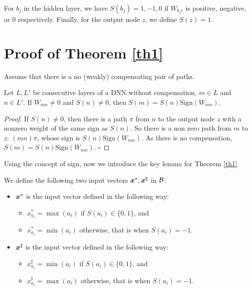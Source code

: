 For $b_j$ in the hidden layer, we have $S(b_j)=1,-1,0$ if $W_{b_j c}$ is positive, negative, or 0 respectively. Finally, for the output node $z$, we define $S(z)=1$.





\section{Proof of Theorem \ref{th1}}	


Assume that there is a no (weakly) compensating pair of paths.


\begin{lemma}
	\label{lemma1}
	Let $L,L'$ be consecutive layers of a DNN without compensation, 
	$m\in L$ and $n\in L'$. If $W_{m n} \neq 0$ and $S(n) \neq 0$, then 
	$S(m)=S(n)\mathrm{Sign}(W_{n m})$.
\end{lemma}

\begin{proof}
	If $S(n) \neq 0$, then there is a path $\pi$ from $n$ to the output node $z$ with a nonzero weight of the same sign as $S(n)$. 
	So there is a non zero path from $m$ to $z$: $(m n) \pi$, whose sign is 
	$S(n)\mathrm{Sign}(W_{n m})$. As there is no compensation, $S(m)=S(n)\mathrm{Sign}(W_{n m})$.
	\hfill $\square$
\end{proof}



Using the concept of sign, now we introduce the key lemma for Theorem \ref{th1}.

\begin{definition}
We define the following two input vectors $\boldsymbol{x}^{*}, \boldsymbol{x}^{\sharp}$ in $\cal B$: 
	\begin{itemize}
		\item $\boldsymbol{x}^{*}$ is the input vector defined in the following way:
		\begin {itemize}
		 \item $x^*_{a_i}=\max(a_i)$ if $S(a_i)\in \{0,1\}$, and
          \item $x^*_{a_i}=\min(a_i)$ otherwise, that is when $S(a_i)=-1$.
	\end{itemize}
		
		\item $\boldsymbol{x}^{\sharp}$ is the input vector defined in the following way:
		\begin{itemize}
			\item $x^{\sharp}_{a_i}=\min(a_i)$ if $S(a_i)\in \{0,1\}$, and
			\item $x^{\sharp}_{a_i}=\max(a_i)$ otherwise, that is when $S(a_i)=-1$.
		\end{itemize}
	\end{itemize}
	
	
	
\end{definition}

